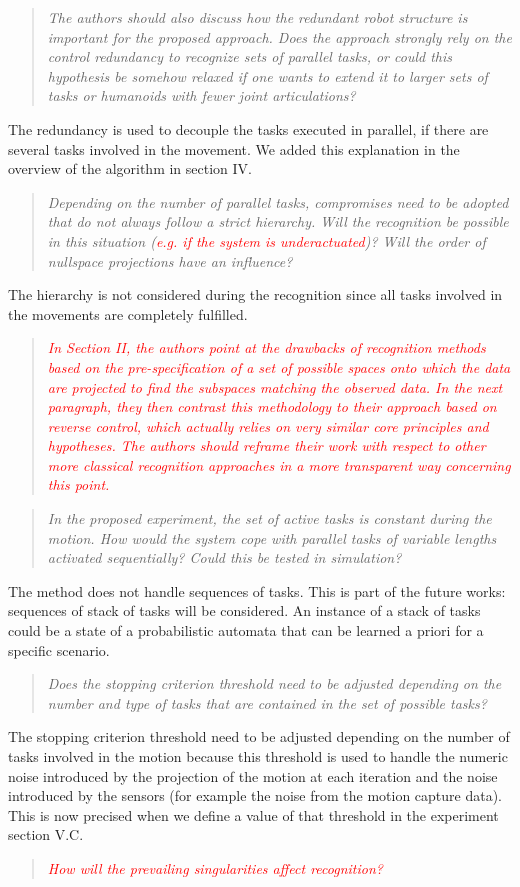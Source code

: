 \documentclass[11pt]{article}
\newcommand{\red}[1]{{\textcolor{red}{#1}}}
\begin{document}
\begin{quote}
\textit{
The authors should also discuss how the redundant robot structure is important for the proposed approach. Does the approach strongly rely on the control redundancy to recognize sets of parallel tasks, or could this hypothesis be somehow relaxed if one wants to extend it to larger sets of tasks or humanoids with fewer joint articulations?
}
\end{quote}
The redundancy is used to decouple the tasks executed in parallel, if there are several tasks involved in the movement.
We added this explanation in the overview of the algorithm in section IV.

\begin{quote}
\textit{
Depending on the number of parallel tasks, compromises need to be adopted that do not always follow a strict hierarchy. Will the recognition be possible in this situation (\red{e.g. if the system is underactuated})? Will the order of nullspace projections have an influence?
}
\end{quote}
The hierarchy is not considered during the recognition since all tasks involved in the movements are completely fulfilled.

\begin{quote}
\textit{
\red{In Section II, the authors point at the drawbacks of recognition methods based on the pre-specification of a set of possible spaces onto which the data are projected to find the subspaces matching the observed data. In the next paragraph, they then contrast this methodology to their approach based on reverse control, which actually relies on very similar core principles and hypotheses. The authors should reframe their work with respect to other more classical recognition approaches in a more transparent way concerning this point.
}
}
\end{quote}

\begin{quote}
\textit{
In the proposed experiment, the set of active tasks is constant during the motion. How would the system cope with parallel tasks of variable lengths activated sequentially? Could this be tested in simulation?
}
\end{quote}
The method does not handle sequences of tasks. This is part of the future works:
sequences of stack of tasks will be considered. An instance of a stack
of tasks could be a state of a probabilistic automata that can be learned a priori for
a specific scenario. 

\begin{quote}
\textit{
Does the stopping criterion threshold need to be adjusted depending on the number and type of tasks that are contained in the set of possible tasks?
}
\end{quote}
The stopping criterion threshold need to be adjusted depending on the number of tasks involved in
the motion because this threshold is used to handle the numeric noise introduced by the
projection of the motion at each iteration and the noise introduced by the sensors (for example 
the noise from the motion capture data).\\
This is now precised when we define a value of that threshold in the experiment section V.C.

\begin{quote}
\textit{
  \red{ How will the prevailing singularities affect recognition?}
}
\end{quote}



\end{document}
